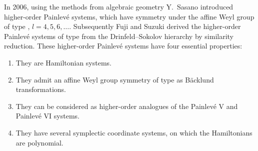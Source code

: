 \documentclass[pdftex]{sigma}
\numberwithin{equation}{section}
\begin{document}
 In 2006, using the methods from algebraic geometry Y.~Sasano \cite{Sa} introduced higher-order Painlev\'{e}
 systems, which have symmetry under the affine Weyl group of type , $l=4, 5, 6, \dots$. Subsequently Fuji and Suzuki \cite{FS} derived the higher-order
 Painlev\'{e} systems of type  from the Drinfeld--Sokolov hierarchy by similarity reduction.
 These higher-order Painlev\'{e} systems have four essential properties:
 \begin{enumerate}\itemsep=0pt
 \item They are Hamiltonian systems.
 	\item
 	They admit an affine Weyl group symmetry of type  as B\"{a}cklund transformations.
 	\item
 	They can be considered as higher-order analogues of the Painlev\'{e} V and Painlev\'e VI systems.
 	\item
 	They have several symplectic coordinate systems, on which the Hamiltonians are polynomial.
 \end{enumerate}
\end{document}
